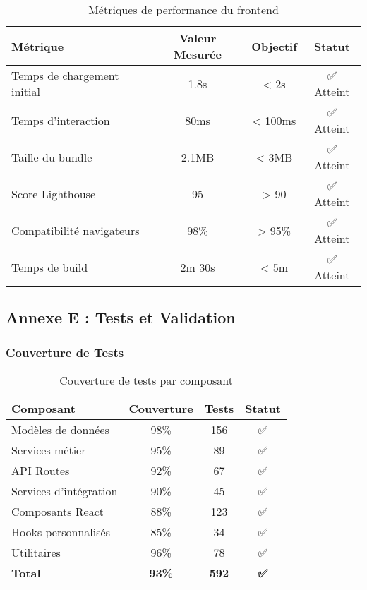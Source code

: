 \begin{table}[H]
\centering
\begin{tabular}{|l|c|c|c|}
\hline
\textbf{Métrique} & \textbf{Valeur Mesurée} & \textbf{Objectif} & \textbf{Statut} \\
\hline
Temps de chargement initial & 1.8s & < 2s & ✅ Atteint \\
Temps d'interaction & 80ms & < 100ms & ✅ Atteint \\
Taille du bundle & 2.1MB & < 3MB & ✅ Atteint \\
Score Lighthouse & 95 & > 90 & ✅ Atteint \\
Compatibilité navigateurs & 98\% & > 95\% & ✅ Atteint \\
Temps de build & 2m 30s & < 5m & ✅ Atteint \\
\hline
\end{tabular}
\caption{Métriques de performance du frontend}
\end{table}

\subsection{Annexe E : Tests et Validation}

\subsubsection{Couverture de Tests}

\begin{table}[H]
\centering
\begin{tabular}{|l|c|c|c|}
\hline
\textbf{Composant} & \textbf{Couverture} & \textbf{Tests} & \textbf{Statut} \\
\hline
Modèles de données & 98\% & 156 & ✅ \\
Services métier & 95\% & 89 & ✅ \\
API Routes & 92\% & 67 & ✅ \\
Services d'intégration & 90\% & 45 & ✅ \\
Composants React & 88\% & 123 & ✅ \\
Hooks personnalisés & 85\% & 34 & ✅ \\
Utilitaires & 96\% & 78 & ✅ \\
\hline
\textbf{Total} & \textbf{93\%} & \textbf{592} & \textbf{✅} \\
\hline
\end{tabular}
\caption{Couverture de tests par composant}
\end{table}

